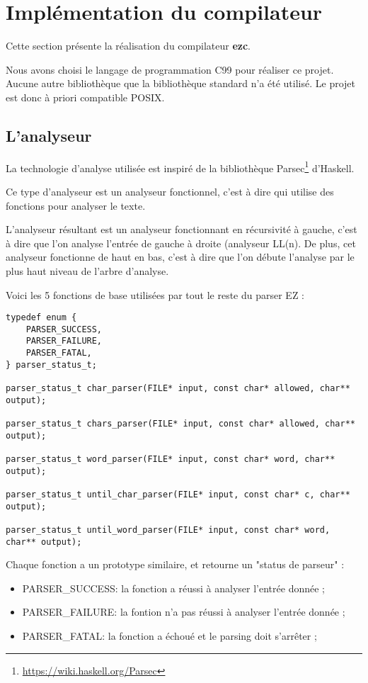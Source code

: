 \section{Implémentation du compilateur}

Cette section présente la réalisation du compilateur \textbf{ezc}.

Nous avons choisi le langage de programmation C99 pour réaliser ce projet.
Aucune autre bibliothèque que la bibliothèque standard n'a été utilisé. Le
projet est donc à priori compatible POSIX.

\subsection{L'analyseur}

La technologie d'analyse utilisée est inspiré de la bibliothèque
Parsec\footnote{\url{https://wiki.haskell.org/Parsec}} d'Haskell.

Ce type d'analyseur est un analyseur fonctionnel, c'est à dire qui utilise des
fonctions pour analyser le texte.

L'analyseur résultant est un analyseur fonctionnant en récursivité à gauche,
c'est à dire que l'on analyse l'entrée de gauche à droite (analyseur LL(n).
De plus, cet analyseur fonctionne de haut en bas, c'est à dire que l'on débute
l'analyse par le plus haut niveau de l'arbre d'analyse.

Voici les 5 fonctions de base utilisées par tout le reste du parser EZ :
\begin{verbatim}
typedef enum {
    PARSER_SUCCESS,
    PARSER_FAILURE,
    PARSER_FATAL,
} parser_status_t;

parser_status_t char_parser(FILE* input, const char* allowed, char** output);

parser_status_t chars_parser(FILE* input, const char* allowed, char** output);

parser_status_t word_parser(FILE* input, const char* word, char** output);

parser_status_t until_char_parser(FILE* input, const char* c, char** output);

parser_status_t until_word_parser(FILE* input, const char* word, char** output);
\end{verbatim}
Chaque fonction a un prototype similaire, et retourne un "status de parseur" :
\begin{itemize}
    \item PARSER\_SUCCESS: la fonction a réussi à analyser l'entrée donnée ;
    \item PARSER\_FAILURE: la fontion n'a pas réussi à analyser l'entrée donnée ;
    \item PARSER\_FATAL: la fonction a échoué et le parsing doit s'arrêter ;
\end{itemize}

